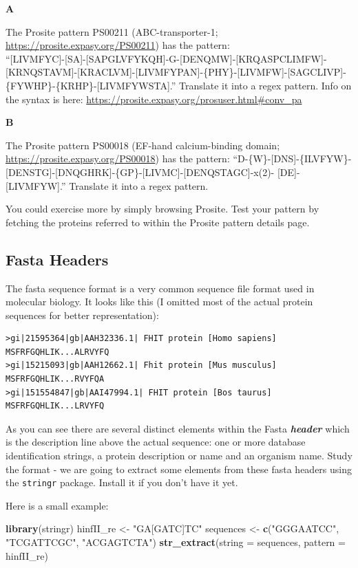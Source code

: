 \documentclass[]{book}
\newenvironment{Shaded}{\begin{snugshade}}{\end{snugshade}}
\newcommand{\DataTypeTok}[1]{\textcolor[rgb]{0.13,0.29,0.53}{#1}}
\newcommand{\KeywordTok}[1]{\textcolor[rgb]{0.13,0.29,0.53}{\textbf{#1}}}
\newcommand{\NormalTok}[1]{#1}
\newcommand{\StringTok}[1]{\textcolor[rgb]{0.31,0.60,0.02}{#1}}
\begin{document}
\textbf{A}

The Prosite pattern PS00211 (ABC-transporter-1; \url{https://prosite.expasy.org/PS00211}) has the pattern:\\
``{[}LIVMFYC{]}-{[}SA{]}-{[}SAPGLVFYKQH{]}-G-{[}DENQMW{]}-{[}KRQASPCLIMFW{]}-{[}KRNQSTAVM{]}-{[}KRACLVM{]}-{[}LIVMFYPAN{]}-\{PHY\}-{[}LIVMFW{]}-{[}SAGCLIVP{]}-\{FYWHP\}-\{KRHP\}-{[}LIVMFYWSTA{]}.''
Translate it into a regex pattern. Info on the syntax is here: \url{https://prosite.expasy.org/prosuser.html\#conv_pa}

\textbf{B}

The Prosite pattern PS00018 (EF-hand calcium-binding domain; \url{https://prosite.expasy.org/PS00018}) has the pattern:
``D-\{W\}-{[}DNS{]}-\{ILVFYW\}-{[}DENSTG{]}-{[}DNQGHRK{]}-\{GP\}-{[}LIVMC{]}-{[}DENQSTAGC{]}-x(2)- {[}DE{]}-{[}LIVMFYW{]}.''
Translate it into a regex pattern.

You could exercise more by simply browsing Prosite. Test your pattern by fetching the proteins referred to within the Prosite pattern details page.

\hypertarget{fasta-headers}{%
\subsection{Fasta Headers}\label{fasta-headers}}

The fasta sequence format is a very common sequence file format used in molecular biology.
It looks like this (I omitted most of the actual protein sequences for better representation):

\begin{verbatim}
>gi|21595364|gb|AAH32336.1| FHIT protein [Homo sapiens]
MSFRFGQHLIK...ALRVYFQ
>gi|15215093|gb|AAH12662.1| Fhit protein [Mus musculus]
MSFRFGQHLIK...RVYFQA
>gi|151554847|gb|AAI47994.1| FHIT protein [Bos taurus]
MSFRFGQHLIK...LRVYFQ
\end{verbatim}

As you can see there are several distinct elements within the Fasta \textbf{\emph{header}} which is the description line above the actual sequence: one or more database identification strings, a protein description or name and an organism name. Study the format - we are going to extract some elements from these fasta headers using the \texttt{stringr} package. Install it if you don't have it yet.

Here is a small example:

\begin{Shaded}
\begin{Highlighting}[]
\KeywordTok{library}\NormalTok{(stringr)}
\NormalTok{hinfII_re <-}\StringTok{ "GA[GATC]TC"}
\NormalTok{sequences <-}\StringTok{ }\KeywordTok{c}\NormalTok{(}\StringTok{"GGGAATCC"}\NormalTok{, }\StringTok{"TCGATTCGC"}\NormalTok{, }\StringTok{"ACGAGTCTA"}\NormalTok{)}
\KeywordTok{str_extract}\NormalTok{(}\DataTypeTok{string =}\NormalTok{ sequences,}
            \DataTypeTok{pattern =}\NormalTok{ hinfII_re)}
\end{Highlighting}
\end{Shaded}
\end{document}
